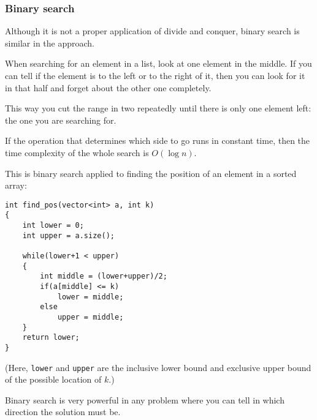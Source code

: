 \subsubsection{Binary search}

Although it is not a proper application of divide and conquer,
binary search is similar in the approach.

When searching for an element in a list, look at one element in the middle.
If you can tell if the element is to the left or to the right of it,
then you can look for it in that half and forget about the other one
completely.

This way you cut the range in two repeatedly until there is only one element
left: the one you are searching for.

If the operation that determines which side to go runs in constant time,
then the time complexity of the whole search is $O(\log n)$.

This is binary search applied to finding the position of an element
in a sorted array:

\begin{verbatim}
int find_pos(vector<int> a, int k)
{
    int lower = 0;
    int upper = a.size();

    while(lower+1 < upper)
    {
        int middle = (lower+upper)/2;
        if(a[middle] <= k)
            lower = middle;
        else
            upper = middle;
    }
    return lower;
}
\end{verbatim}

(Here, \texttt{lower} and \texttt{upper} are the inclusive lower bound
and exclusive upper bound of the possible location of $k$.)

Binary search is very powerful in any problem where you can tell
in which direction the solution must be.
